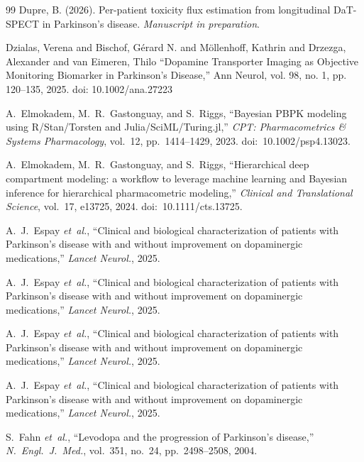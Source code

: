 \begin{thebibliography}{99}
Dupre, B. (2026).
\newblock Per-patient toxicity flux estimation from longitudinal DaT-SPECT in Parkinson's disease.
\newblock \emph{Manuscript in preparation}.

 Dzialas, Verena and Bischof, G\'erard N. and M\"ollenhoff, Kathrin and Drzezga, Alexander and van Eimeren, Thilo ``Dopamine Transporter Imaging as Objective Monitoring Biomarker in Parkinson's Disease,'' Ann Neurol, vol. 98, no. 1, pp. 120--135, 2025. doi: 10.1002/ana.27223

A.~Elmokadem, M.~R.~Gastonguay, and S.~Riggs, ``Bayesian PBPK modeling using R/Stan/Torsten and Julia/SciML/Turing.jl,'' \textit{CPT: Pharmacometrics \& Systems Pharmacology}, vol.~12, pp.~1414--1429, 2023. doi:~10.1002/psp4.13023.

A.~Elmokadem, M.~R.~Gastonguay, and S.~Riggs, ``Hierarchical deep compartment modeling: a workflow to leverage machine learning and Bayesian inference for hierarchical pharmacometric modeling,'' \textit{Clinical and Translational Science}, vol.~17, e13725, 2024. doi:~10.1111/cts.13725.

A.~J.~Espay \textit{et~al.}, ``Clinical and biological characterization of patients with Parkinson's disease with and without improvement on dopaminergic medications,'' \textit{Lancet Neurol.}, 2025.

A.~J.~Espay \textit{et~al.}, ``Clinical and biological characterization of patients with Parkinson's disease with and without improvement on dopaminergic medications,'' \textit{Lancet Neurol.}, 2025.

A.~J.~Espay \textit{et~al.}, ``Clinical and biological characterization of patients with Parkinson's disease with and without improvement on dopaminergic medications,'' \textit{Lancet Neurol.}, 2025.

A.~J.~Espay \textit{et~al.}, ``Clinical and biological characterization of patients with Parkinson's disease with and without improvement on dopaminergic medications,'' \textit{Lancet Neurol.}, 2025.


S.~Fahn \textit{et~al.}, ``Levodopa and the progression of Parkinson's
disease,'' \textit{N.\ Engl.\ J.\ Med.}, vol.~351, no.~24,
pp.~2498--2508, 2004.



\end{thebibliography}
